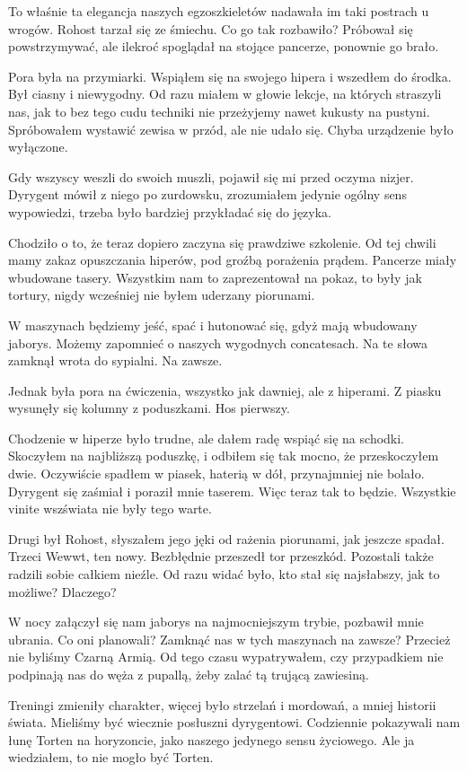 To właśnie ta elegancja naszych egzoszkieletów nadawała im taki postrach u wrogów.
Rohost tarzał się ze śmiechu. Co go tak rozbawiło?
Próbował się powstrzymywać, ale ilekroć spoglądał na stojące pancerze, ponownie go brało.

Pora była na przymiarki.
Wspiąłem się na swojego hipera i wszedłem do środka.
Był ciasny i niewygodny.
Od razu miałem w głowie lekcje, na których straszyli nas, jak to bez tego cudu techniki nie przeżyjemy nawet kukusty na pustyni.
Spróbowałem wystawić zewisa w przód, ale nie udało się.
Chyba urządzenie było wyłączone.

Gdy wszyscy weszli do swoich muszli, pojawił się mi przed oczyma nizjer.
Dyrygent mówił z niego po zurdowsku, zrozumiałem jedynie ogólny sens wypowiedzi, trzeba było bardziej przykładać się do języka.

Chodziło o to, że teraz dopiero zaczyna się prawdziwe szkolenie.
Od tej chwili mamy zakaz opuszczania hiperów, pod groźbą porażenia prądem.
Pancerze miały wbudowane tasery.
Wszystkim nam to zaprezentował na pokaz, to były jak tortury, nigdy wcześniej nie byłem uderzany piorunami.

W maszynach będziemy jeść, spać i hutonować się, gdyż mają wbudowany jaborys.
Możemy zapomnieć o naszych wygodnych concatesach.
Na te słowa zamknął wrota do sypialni. Na zawsze.

Jednak była pora na ćwiczenia, wszystko jak dawniej, ale z hiperami.
Z piasku wysunęły się kolumny z poduszkami.
Hos pierwszy.

Chodzenie w hiperze było trudne, ale dałem radę wspiąć się na schodki.
Skoczyłem na najbliższą poduszkę, i odbiłem się tak mocno, że przeskoczyłem dwie.
Oczywiście spadłem w piasek, haterią w dół, przynajmniej nie bolało.
Dyrygent się zaśmiał i poraził mnie taserem. Więc teraz tak to będzie.
Wszystkie vinite wszświata nie były tego warte.

Drugi był Rohost, słyszałem jego jęki od rażenia piorunami, jak jeszcze spadał.
Trzeci Wewwt, ten nowy.
Bezbłędnie przeszedł tor przeszkód.
Pozostali także radzili sobie całkiem nieźle.
Od razu widać było, kto stał się najsłabszy, jak to możliwe?
Dlaczego?

W nocy załączył się nam jaborys na najmocniejszym trybie, pozbawił mnie ubrania.
Co oni planowali? Zamknąć nas w tych maszynach na zawsze? Przecież nie byliśmy Czarną Armią.
Od tego czasu wypatrywałem, czy przypadkiem nie podpinają nas do węża z pupallą, żeby zalać tą trującą zawiesiną.

Treningi zmieniły charakter, więcej było strzelań i mordowań, a mniej historii świata.
Mieliśmy być wiecznie posłuszni dyrygentowi. Codziennie pokazywali nam łunę Torten na horyzoncie, jako naszego jedynego sensu życiowego.
Ale ja wiedziałem, to nie mogło być Torten.

